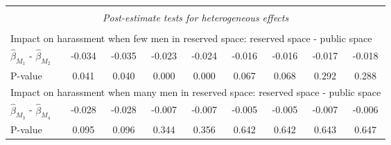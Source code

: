 \begin{tabular}{l*{8}{c}}
\hline \\[-1ex]  \multicolumn{9}{c}{\textit{Post-estimate tests for heterogeneous effects}} \\\\[-1ex] \multicolumn{9}{l}{Impact on harassment when few men in reserved space: reserved space - public space} \\ \quad $\hat\beta_{M_1}$ - $\hat\beta_{M_2}$&      -0.034         &      -0.035         &      -0.023         &      -0.024         &      -0.016         &      -0.016         &      -0.017         &      -0.018         \\
\quad P-value       &       0.041         &       0.040         &       0.000         &       0.000         &       0.067         &       0.068         &       0.292         &       0.288         \\
\multicolumn{9}{l}{Impact on harassment when many men in reserved space: reserved space - public space} \\\quad $\hat\beta_{M_3}$ - $\hat\beta_{M_4}$&      -0.028         &      -0.028         &      -0.007         &      -0.007         &      -0.005         &      -0.005         &      -0.007         &      -0.006         \\
\quad P-value       &       0.095         &       0.096         &       0.344         &       0.356         &       0.642         &       0.642         &       0.643         &       0.647         \\
\hline\hline \end{tabular}
